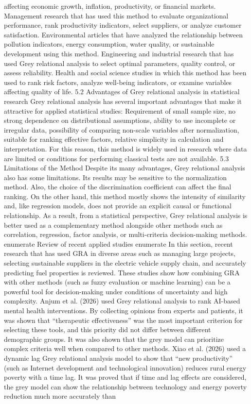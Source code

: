 \documentclass[10pt,twoside]{article}
\begin{document}
\begin{minipage}[t][\textheight]{\textwidth}
affecting economic growth, inflation, productivity, or financial markets. Management research that has used this method to evaluate organizational performance, rank productivity indicators, select suppliers, or analyze customer satisfaction. Environmental articles that have analyzed the relationship between pollution indicators, energy consumption, water quality, or sustainable development using this method. Engineering and industrial research that has used Grey relational analysis to select optimal parameters, quality control, or assess reliability. Health and social science studies in which this method has been used to rank risk factors, analyze well-being indicators, or examine variables affecting quality of life. 5.2 Advantages of Grey relational analysis in statistical research Grey relational analysis has several important advantages that make it attractive for applied statistical studies: Requirement of small sample size, no strong dependence on distributional assumptions, ability to use incomplete or irregular data, possibility of comparing non-scale variables after normalization, suitable for ranking effective factors, relative simplicity in calculation and interpretation. For this reason, this method is widely used in research where data are limited or conditions for performing classical tests are not available. 5.3 Limitations of the Method Despite its many advantages, Grey relational analysis also has some limitations. Its results may be sensitive to the normalization method. Also, the choice of the discrimination coefficient can affect the final ranking. On the other hand, this method mostly shows the intensity of similarity and, like regression models, does not provide an explicit causal or functional relationship. As a result, from a statistical perspective, Grey relational analysis is better used as a complementary method alongside other methods such as correlation, regression, factor analysis, or multi-criteria decision-making methods. enumerate Review of recent applied studies enumerate In this section, recent research that has used GRA in diverse areas such as managing large projects, selecting sustainable suppliers in the electric vehicle supply chain, and accurately predicting fuel properties is reviewed. These studies show how combining GRA with other methods (such as fuzzy evaluation or machine learning) can be a powerful tool for decision-making under conditions of uncertainty and high complexity. Anjum et al. (2026) used Grey relational analysis to rank AI-based mental health interventions. By collecting opinions from experts and patients, it was shown that ``therapeutic effectiveness'' was the most important criterion for selecting these tools, and this priority did not differ between different demographic groups. It was also shown that the grey model can prioritize complex criteria well when compared to other methods. Xiao et al. (2026) used a dynamic lag Grey relational analysis model to show that ``new productivity'' (such as Internet development and technological innovation) reduces rural energy poverty with a time lag. It was proved that if time and lag effects are considered, the grey model can show the relationship between technology and energy poverty reduction much more accurately than 
\end{minipage}
\end{document}
